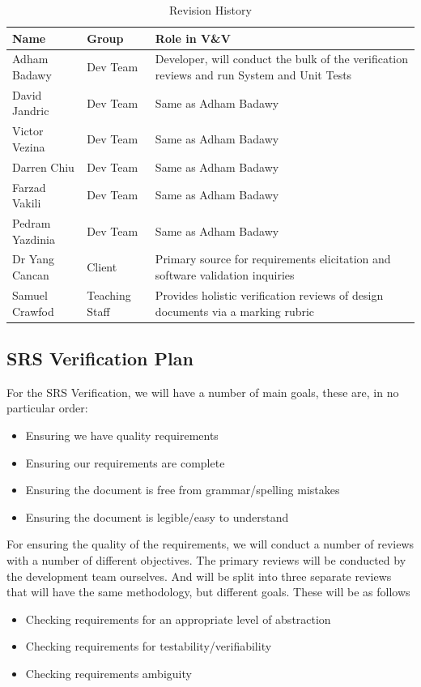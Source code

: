 \documentclass[12pt, titlepage]{article}
\begin{document}
\begin{table}[hp]
  \caption{Revision History} \label{TblRevisionHistory}
  \begin{tabularx}{\textwidth}{llX}
  \toprule
  \textbf{Name} & \textbf{Group} & \textbf{Role in V\&V}\\
  \midrule
  Adham Badawy& Dev Team & Developer, will conduct the bulk of the verification reviews and run System and Unit Tests\\
  David Jandric& Dev Team & Same as Adham Badawy\\
  Victor Vezina& Dev Team & Same as Adham Badawy\\
  Darren Chiu& Dev Team & Same as Adham Badawy\\
  Farzad Vakili& Dev Team & Same as Adham Badawy\\
  Pedram Yazdinia& Dev Team & Same as Adham Badawy\\
  Dr Yang Cancan& Client & Primary source for requirements elicitation and software validation inquiries\\
  Samuel Crawfod& Teaching Staff & Provides holistic verification reviews of design documents via a marking rubric\\
  
  \bottomrule
  \end{tabularx}
  \end{table}

\subsection{SRS Verification Plan}

For the SRS Verification, we will have a number of main goals, these are, in no particular order:
\begin{itemize}
\item Ensuring we have quality requirements
\item Ensuring our requirements are complete
\item Ensuring the document is free from grammar/spelling mistakes
\item Ensuring the document is legible/easy to understand
\end{itemize}
For ensuring the quality of the requirements, we will conduct a number of reviews with a number of different objectives. The primary reviews will be conducted by
the development team ourselves. And will be split into three separate reviews that will have the same methodology, but different goals. These will be as follows
\begin{itemize}
\item Checking requirements for an appropriate level of abstraction
\item Checking requirements for testability/verifiability 
\item Checking requirements ambiguity
\end{itemize} 
\end{document}
